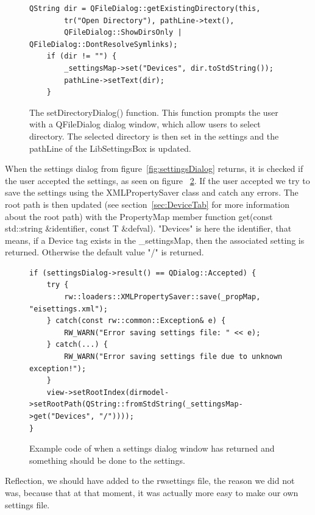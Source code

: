 \begin{figure}[h] %
\centering
\lstset{language=C++} 
\begin{lstlisting}[frame=single]  
QString dir = QFileDialog::getExistingDirectory(this, 
		tr("Open Directory"), pathLine->text(),
	    QFileDialog::ShowDirsOnly | QFileDialog::DontResolveSymlinks);
    if (dir != "") {
        _settingsMap->set("Devices", dir.toStdString());
        pathLine->setText(dir);
    }
\end{lstlisting}
\caption{The setDirectoryDialog() function. This function prompts the user with a QFileDialog dialog window, which allow users to select directory. The selected directory is then set in the settings and the pathLine of the LibSettingsBox is updated.}
\label{fig:settingsCodeQFileDialog} 	
\end{figure}

When the settings dialog from figure~\ref{fig:settingsDialog} returns, it is checked if the user accepted the settings,  as seen on figure ~\ref{fig:settingsCodeReturnDialog}. If the user accepted we try to save the settings using the XMLPropertySaver \cite{XMLPropertySaver} class and catch any errors. The root path is then updated (see section~\ref{sec:DeviceTab} for more information about the root path) with the PropertyMap member function get(const std::string \&identifier, const T \&defval). "Devices" is here the identifier, that means, if a Device tag exists in the \_settingsMap, then the associated setting is returned. Otherwise the default value "/" is returned.

\begin{figure}[h] %
\centering
\lstset{language=C++} 
\begin{lstlisting}[frame=single]  
if (settingsDialog->result() == QDialog::Accepted) {
	try {
		rw::loaders::XMLPropertySaver::save(_propMap, "eisettings.xml");
	} catch(const rw::common::Exception& e) {
		RW_WARN("Error saving settings file: " << e);
	} catch(...) {
		RW_WARN("Error saving settings file due to unknown exception!");
	}
	view->setRootIndex(dirmodel->setRootPath(QString::fromStdString(_settingsMap->get("Devices", "/")))); 
}
\end{lstlisting}
\caption{Example code of when a settings dialog window has returned and something should be done to the settings.}
\label{fig:settingsCodeReturnDialog} 	
\end{figure}

Reflection, we should have added to the rwsettings file, the reason we did not was, because that at that moment, it was actually more easy to make our own settings file.

